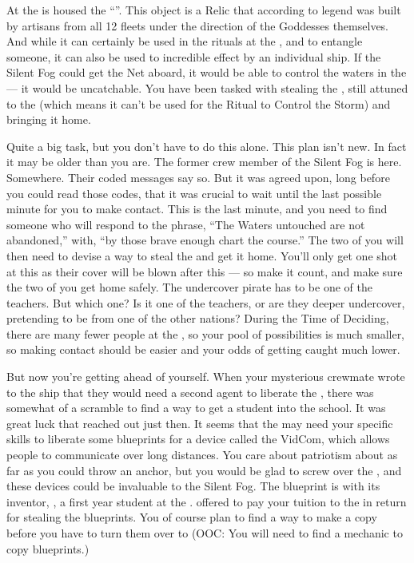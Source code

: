 \documentclass[char]{GL2020}
\begin{document}
At the \pSchool{} is housed the ``\iNet{}''. This object is a Relic that according to legend was built by artisans from all 12 fleets under the direction of the Goddesses themselves. And while it can certainly be used in the rituals at the \pSc{}, and to entangle someone, it can also be used to incredible effect by an individual ship. If the Silent Fog could get the Net aboard, it would be able to control the waters in the \pWod{} — it would be uncatchable. You have been tasked with stealing the \iNet{}, still attuned to the \pShip{} (which means it can’t be used for the Ritual to Control the Storm) and bringing it home.

Quite a big task, but you don't have to do this alone. This plan isn’t new. In fact it may be older than you are. The former crew member of the Silent Fog is here. Somewhere. Their coded messages say so. But it was agreed upon, long before you could read those codes, that it was crucial to wait until the last possible minute for you to make contact. This is the last minute, and you need to find someone who will respond to the phrase, ``The Waters untouched are not abandoned,'' with, ``by those brave enough chart the course.'' The two of you will then need to devise a way to steal the \iNet{} and get it home. You'll only get one shot at this as their cover will be blown after this — so make it count, and make sure the two of you get home safely. The undercover pirate has to be one of the teachers. But which one? Is it one of the \pShip{} teachers, or are they deeper undercover, pretending to be from one of the other nations? During the Time of Deciding, there are many fewer people at the \pSc{}, so your pool of possibilities is much smaller, so making contact should be easier and your odds of getting caught much lower.

But now you're getting ahead of yourself. When your mysterious crewmate wrote to the ship that they would need a second agent to liberate the \iNet{}, there was somewhat of a scramble to find a way to get a student into the school. It was great luck that \cChupLeader{} reached out just then. It seems that the \pShip{} may need your specific skills to liberate some blueprints for a device called the VidCom, which allows people to communicate over long distances. You care about patriotism about as far as you could throw an anchor, but you would be glad to screw over the \pTech{}, and these devices could be invaluable to the Silent Fog. The blueprint is with its inventor, \cTechStar{\full}, a first year student at the \pSchool{}. \cChupLeader{} offered to pay your tuition to the \pSc{} in return for stealing the blueprints. You of course plan to find a way to make a copy before you have to turn them over to \cChupLeader{} (OOC: You will need to find a mechanic to copy blueprints.)
\end{document}
